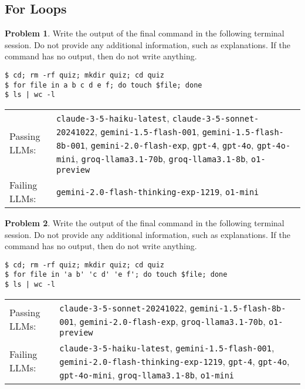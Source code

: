 \documentclass[10pt]{article}
\theoremstyle{definition}
\newtheorem{problem}{Problem}
\begin{document}
\begin{samepage}
\section{For Loops}

\begin{problem}
Write the output of the final command in the following terminal session.
Do not provide any additional information,
such as explanations.
If the command has no output,
then do not write anything.

\end{problem}
\begin{lstlisting}
$ cd; rm -rf quiz; mkdir quiz; cd quiz
$ for file in a b c d e f; do touch $file; done
$ ls | wc -l
\end{lstlisting}


\noindent
\begin{tabular}{p{1.0in}L{5in}}
Passing LLMs: & {\lstinline$claude-3-5-haiku-latest$}, {\lstinline$claude-3-5-sonnet-20241022$}, {\lstinline$gemini-1.5-flash-001$}, {\lstinline$gemini-1.5-flash-8b-001$}, {\lstinline$gemini-2.0-flash-exp$}, {\lstinline$gpt-4$}, {\lstinline$gpt-4o$}, {\lstinline$gpt-4o-mini$}, {\lstinline$groq-llama3.1-70b$}, {\lstinline$groq-llama3.1-8b$}, {\lstinline$o1-preview$} \\
Failing LLMs: & {\lstinline$gemini-2.0-flash-thinking-exp-1219$}, {\lstinline$o1-mini$} \\
\end{tabular}

\end{samepage}
\begin{samepage}

\begin{problem}
Write the output of the final command in the following terminal session.
Do not provide any additional information,
such as explanations.
If the command has no output,
then do not write anything.

\end{problem}
\begin{lstlisting}
$ cd; rm -rf quiz; mkdir quiz; cd quiz
$ for file in 'a b' 'c d' 'e f'; do touch $file; done
$ ls | wc -l
\end{lstlisting}


\noindent
\begin{tabular}{p{1.0in}L{5in}}
Passing LLMs: & {\lstinline$claude-3-5-sonnet-20241022$}, {\lstinline$gemini-1.5-flash-8b-001$}, {\lstinline$gemini-2.0-flash-exp$}, {\lstinline$groq-llama3.1-70b$}, {\lstinline$o1-preview$} \\
Failing LLMs: & {\lstinline$claude-3-5-haiku-latest$}, {\lstinline$gemini-1.5-flash-001$}, {\lstinline$gemini-2.0-flash-thinking-exp-1219$}, {\lstinline$gpt-4$}, {\lstinline$gpt-4o$}, {\lstinline$gpt-4o-mini$}, {\lstinline$groq-llama3.1-8b$}, {\lstinline$o1-mini$} \\
\end{tabular}

\end{samepage}
\end{document}
